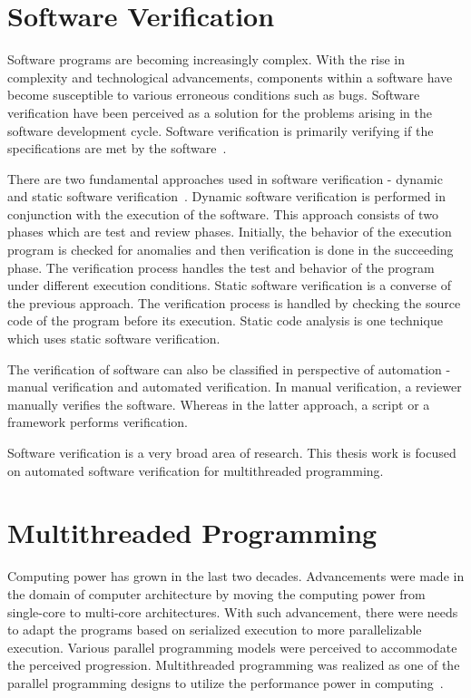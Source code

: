 \section{Software Verification}

Software programs are becoming increasingly complex. 
With the rise in complexity and technological advancements, components within a software have become susceptible to various erroneous conditions such as bugs. 
Software verification have been perceived as a solution for the problems arising in the software development cycle. 
Software verification is primarily verifying if the specifications are met by the software~\citep{ghezzi2002fundamentals}.

There are two fundamental approaches used in software verification - dynamic and static software verification~\citep{ghezzi2002fundamentals}. 
Dynamic software verification is performed in conjunction with the execution of the software. 
This approach consists of two phases which are test and review phases. 
Initially, the behavior of the execution program is checked for anomalies and then verification is done in the succeeding phase. 
The verification process handles the test and behavior of the program under different execution conditions. 
Static software verification is a converse of the previous approach. 
The verification process is handled by checking the source code of the program before its execution. 
Static code analysis is one technique which uses static software verification. 

The verification of software can also be classified in perspective of automation - manual verification and automated verification. 
In manual verification, a reviewer manually verifies the software. 
Whereas in the latter approach, a script or a framework performs  verification. 

Software verification is a very broad area of research. 
This thesis work is focused on automated software verification for multithreaded programming. 

\section{Multithreaded Programming \label{multi_thread}}

Computing power has grown in the last two decades. 
Advancements were made in the domain of computer architecture by moving the computing power from single-core to multi-core architectures. 
With such advancement, there were needs to adapt the programs based on serialized execution to more parallelizable execution. 
Various parallel programming models were perceived to accommodate the perceived progression. 
Multithreaded programming was realized as one of the parallel programming designs to utilize the performance power in computing~\citep{carver2005modern}. 

